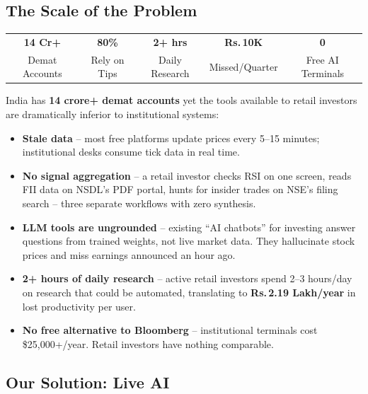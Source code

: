 \documentclass[11pt, a4paper]{article}
\newcommand{\Rs}{Rs.\,}
\begin{document}
\subsection{The Scale of the Problem}

\begin{keymetricbox}
\centering
\begin{tabular}{ccccc}
  {\LARGE\bfseries\color{navy}14 Cr+} &
  {\LARGE\bfseries\color{red}80\%} &
  {\LARGE\bfseries\color{orange}2+ hrs} &
  {\LARGE\bfseries\color{purple}\Rs{}10K} &
  {\LARGE\bfseries\color{steel}0} \\[3pt]
  {\scriptsize\color{steel}Demat Accounts} &
  {\scriptsize\color{steel}Rely on Tips} &
  {\scriptsize\color{steel}Daily Research} &
  {\scriptsize\color{steel}Missed/Quarter} &
  {\scriptsize\color{steel}Free AI Terminals}
\end{tabular}
\end{keymetricbox}

\medskip

India has \textbf{14 crore+ demat accounts} yet the tools available to retail investors
are dramatically inferior to institutional systems:

\begin{itemize}[leftmargin=1.6em, itemsep=3pt]
  \item \textbf{Stale data} -- most free platforms update prices every 5--15 minutes;
        institutional desks consume tick data in real time.
  \item \textbf{No signal aggregation} -- a retail investor checks RSI on one screen, reads
        FII data on NSDL's PDF portal, hunts for insider trades on NSE's filing search --
        three separate workflows with zero synthesis.
  \item \textbf{LLM tools are ungrounded} -- existing ``AI chatbots'' for investing answer
        questions from trained weights, not live market data. They hallucinate stock prices
        and miss earnings announced an hour ago.
  \item \textbf{2+ hours of daily research} -- active retail investors spend 2--3 hours/day
        on research that could be automated, translating to \textbf{\Rs{}2.19 Lakh/year} in
        lost productivity per user.
  \item \textbf{No free alternative to Bloomberg} -- institutional terminals cost \$25,000+/year.
        Retail investors have nothing comparable.
\end{itemize}

\subsection{Our Solution: Live AI}
\end{document}
